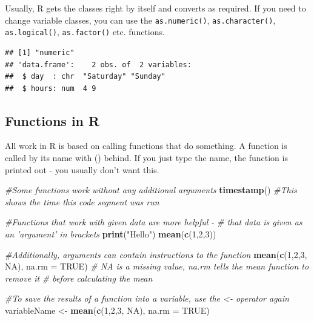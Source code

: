 \documentclass[
]{book}
\newenvironment{Shaded}{\begin{snugshade}}{\end{snugshade}}
\newcommand{\CommentTok}[1]{\textcolor[rgb]{0.56,0.35,0.01}{\textit{#1}}}
\newcommand{\DataTypeTok}[1]{\textcolor[rgb]{0.13,0.29,0.53}{#1}}
\newcommand{\DecValTok}[1]{\textcolor[rgb]{0.00,0.00,0.81}{#1}}
\newcommand{\KeywordTok}[1]{\textcolor[rgb]{0.13,0.29,0.53}{\textbf{#1}}}
\newcommand{\NormalTok}[1]{#1}
\newcommand{\OperatorTok}[1]{\textcolor[rgb]{0.81,0.36,0.00}{\textbf{#1}}}
\newcommand{\OtherTok}[1]{\textcolor[rgb]{0.56,0.35,0.01}{#1}}
\newcommand{\StringTok}[1]{\textcolor[rgb]{0.31,0.60,0.02}{#1}}
\begin{document}
Usually, R gets the classes right by itself and converts as required. If you need to change variable classes, you can use the \texttt{as.numeric()}, \texttt{as.character()}, \texttt{as.logical()}, \texttt{as.factor()} etc. functions.

\begin{Shaded}
\end{Shaded}

\begin{verbatim}
## [1] "numeric"
## 'data.frame':	2 obs. of  2 variables:
##  $ day  : chr  "Saturday" "Sunday"
##  $ hours: num  4 9
\end{verbatim}

\hypertarget{functions-in-r}{%
\subsection{Functions in R}\label{functions-in-r}}

All work in R is based on calling functions that do something. A function is called by its name with () behind. If you just type the name, the function is printed out - you usually don't want this.

\begin{Shaded}
\begin{Highlighting}[]
\CommentTok{#Some functions work without any additional arguments}
\KeywordTok{timestamp}\NormalTok{() }\CommentTok{#This shows the time this code segment was run}

\CommentTok{#Functions that work with given data are more helpful - }
\CommentTok{# that data is given as an 'argument' in brackets}
\KeywordTok{print}\NormalTok{(}\StringTok{"Hello"}\NormalTok{)}
\KeywordTok{mean}\NormalTok{(}\KeywordTok{c}\NormalTok{(}\DecValTok{1}\NormalTok{,}\DecValTok{2}\NormalTok{,}\DecValTok{3}\NormalTok{))}

\CommentTok{#Additionally, arguments can contain instructions to the function}
\KeywordTok{mean}\NormalTok{(}\KeywordTok{c}\NormalTok{(}\DecValTok{1}\NormalTok{,}\DecValTok{2}\NormalTok{,}\DecValTok{3}\NormalTok{, }\OtherTok{NA}\NormalTok{), }\DataTypeTok{na.rm =} \OtherTok{TRUE}\NormalTok{)}
\CommentTok{# NA is a missing value, na.rm tells the mean function to remove it }
\CommentTok{# before calculating the mean}

\CommentTok{#To save the results of a function into a variable, use the <- operator again}
\NormalTok{variableName <-}\StringTok{ }\KeywordTok{mean}\NormalTok{(}\KeywordTok{c}\NormalTok{(}\DecValTok{1}\NormalTok{,}\DecValTok{2}\NormalTok{,}\DecValTok{3}\NormalTok{, }\OtherTok{NA}\NormalTok{), }\DataTypeTok{na.rm =} \OtherTok{TRUE}\NormalTok{)}
\end{Highlighting}
\end{Shaded}
\end{document}

